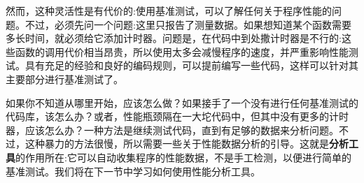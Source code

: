 然而，这种灵活性是有代价的:使用基准测试，可以了解任何关于程序性能的问题。不过，必须先问一个问题:这里只报告了测量数据。如果想知道某个函数需要多长时间，就必须给它添加计时器。问题是，在代码中到处撒计时器是不行的:这些函数的调用代价相当昂贵，所以使用太多会减慢程序的速度，并严重影响性能测试。具有充足的经验和良好的编码规则，可以提前编写一些代码，这样可以针对其主要部分进行基准测试了。

如果你不知道从哪里开始，应该怎么做？如果接手了一个没有进行任何基准测试的代码库，该怎么办？或者，性能瓶颈隔在一大坨代码中，但其中没有更多的计时器，应该怎么办？一种方法是继续测试代码，直到有足够的数据来分析问题。不过，这种暴力的方法很慢，所以需要一些关于性能数据分析的引导。这就是\textbf{分析工具}的作用所在:它可以自动收集程序的性能数据，不是手工检测，以便进行简单的基准测试。我们将在下一节中学习如何使用性能分析工具。






